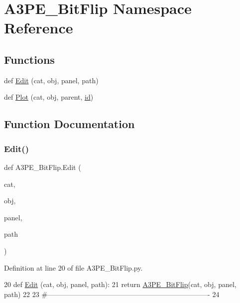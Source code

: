 \hypertarget{namespaceA3PE__BitFlip}{}\section{A3\+P\+E\+\_\+\+Bit\+Flip Namespace Reference}
\label{namespaceA3PE__BitFlip}
\subsection*{Functions}
\begin{DoxyCompactItemize}
\item 
def \hyperlink{namespaceA3PE__BitFlip_a29b0fbbb25f0545849d21cbc206a605a}{Edit} (cat, obj, panel, path)
\item 
def \hyperlink{namespaceA3PE__BitFlip_a92d3bf7ea8a6d5c0a9a07bd018abc40a}{Plot} (cat, obj, parent, \hyperlink{classObject_af99145335cc61ff6e2798ea17db009d2}{id})
\end{DoxyCompactItemize}


\subsection{Function Documentation}
\mbox{\label{namespaceA3PE__BitFlip_a29b0fbbb25f0545849d21cbc206a605a}} 
\subsubsection{\texorpdfstring{Edit()}{Edit()}}
{\footnotesize\ttfamily def A3\+P\+E\+\_\+\+Bit\+Flip.\+Edit (\begin{DoxyParamCaption}\item[{}]{cat,  }\item[{}]{obj,  }\item[{}]{panel,  }\item[{}]{path }\end{DoxyParamCaption})}



Definition at line 20 of file A3\+P\+E\+\_\+\+Bit\+Flip.\+py.


\begin{DoxyCode}
20 \textcolor{keyword}{def }\hyperlink{namespaceA3PE__BitFlip_a29b0fbbb25f0545849d21cbc206a605a}{Edit} (cat, obj, panel, path):
21     \textcolor{keywordflow}{return} \hyperlink{classA3PE__BitFlip}{A3PE\_BitFlip}(cat, obj, panel, path)
22 
23 \textcolor{comment}{#----------------------------------------------------------------------}
24 
\end{DoxyCode}
\mbox{\label{namespaceA3PE__BitFlip_a92d3bf7ea8a6d5c0a9a07bd018abc40a}} 
